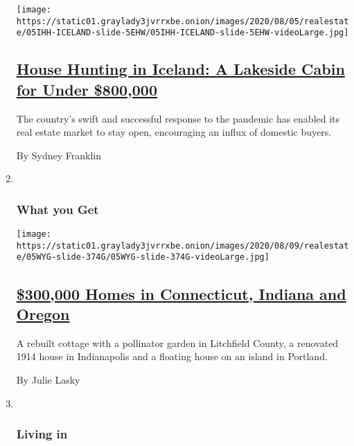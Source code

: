 \begin{enumerate}
  \texttt{[image: https://static01.graylady3jvrrxbe.onion/images/2020/08/05/realestate/05IHH-ICELAND-slide-5EHW/05IHH-ICELAND-slide-5EHW-videoLarge.jpg]}

  \hypertarget{house-hunting-in-iceland-a-lakeside-cabin-for-under-800000}{%
  \subsection{\texorpdfstring{\href{/2020/08/05/realestate/house-hunting-in-iceland-a-lakeside-summer-house-for-773000.html}{House
  Hunting in Iceland: A Lakeside Cabin for Under
  \$800,000}}{House Hunting in Iceland: A Lakeside Cabin for Under \$800,000}}\label{house-hunting-in-iceland-a-lakeside-cabin-for-under-800000}}

  The country's swift and successful response to the pandemic has
  enabled its real estate market to stay open, encouraging an influx of
  domestic buyers.

  By Sydney Franklin
\item ~
  \hypertarget{what-you-get}{%
  \subsubsection{What you Get}\label{what-you-get}}

  \texttt{[image: https://static01.graylady3jvrrxbe.onion/images/2020/08/09/realestate/05WYG-slide-374G/05WYG-slide-374G-videoLarge.jpg]}

  \hypertarget{300000-homes-in-connecticut-indiana-and-oregon}{%
  \subsection{\texorpdfstring{\href{/2020/08/05/realestate/300000-dollar-homes-for-sale-in-ct-or-in.html}{\$300,000
  Homes in Connecticut, Indiana and
  Oregon}}{\$300,000 Homes in Connecticut, Indiana and Oregon}}\label{300000-homes-in-connecticut-indiana-and-oregon}}

  A rebuilt cottage with a pollinator garden in Litchfield County, a
  renovated 1914 house in Indianapolis and a floating house on an island
  in Portland.

  By Julie Lasky
\item ~
  \hypertarget{living-in}{%
  \subsubsection{Living in}\label{living-in}}


\end{enumerate}
